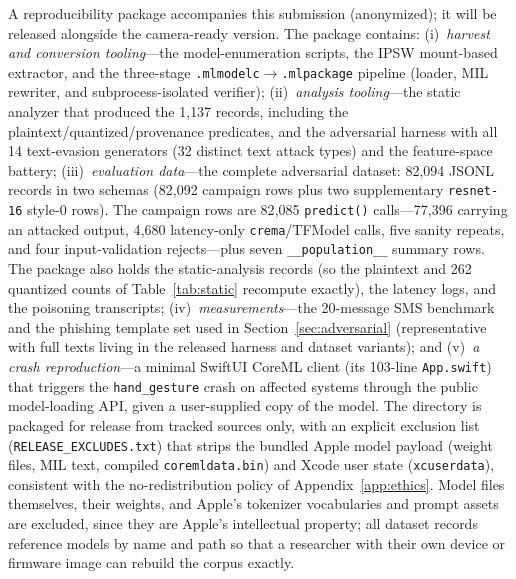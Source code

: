 \documentclass[letterpaper,twocolumn,10pt]{article}
\newcommand{\mlmodelc}{\texttt{.mlmodelc}\xspace}
\newcommand{\mlpackage}{\texttt{.mlpackage}\xspace}
\begin{document}
A reproducibility package accompanies this submission (anonymized); it
will be released alongside the camera-ready version.  The package contains:
(i)~\emph{harvest and conversion tooling}---the model-enumeration scripts,
the IPSW mount-based extractor, and the three-stage
\mlmodelc{}$\rightarrow$\mlpackage{} pipeline (loader, MIL rewriter, and
subprocess-isolated verifier);
(ii)~\emph{analysis tooling}---the static analyzer that produced the 1{,}137
records, including the plaintext/quantized/provenance predicates, and the
adversarial harness with all 14 text-evasion generators (32 distinct text
attack types) and the feature-space battery;
(iii)~\emph{evaluation data}---the complete adversarial dataset: 82{,}094
JSONL records in two schemas (82{,}092 campaign rows plus two supplementary
\texttt{resnet-16} style-0 rows). The campaign rows are 82{,}085
\texttt{predict()} calls---77{,}396 carrying an attacked output, 4{,}680
latency-only \texttt{crema}/TFModel calls, five sanity repeats, and four
input-validation rejects---plus seven \texttt{\_\_population\_\_} summary
rows. The package also holds the static-analysis records (so the
plaintext and 262 quantized counts of Table~\ref{tab:static} recompute
exactly), the latency logs, and the poisoning transcripts;
(iv)~\emph{measurements}---the 20-message SMS benchmark and the phishing
template set used in Section~\ref{sec:adversarial} (representative
with full texts living in the released harness and dataset variants); and
(v)~\emph{a crash reproduction}---a minimal SwiftUI CoreML client (its
103-line \texttt{App.swift}) that triggers the \texttt{hand\_gesture}
crash on affected systems through the public model-loading API, given a
user-supplied copy of the model. The directory is packaged for release
from tracked sources only, with an explicit exclusion list
(\texttt{RELEASE\_EXCLUDES.txt}) that strips the bundled Apple model
payload (weight files, MIL text, compiled \texttt{coremldata.bin}) and
Xcode user state (\texttt{xcuserdata}), consistent with the
no-redistribution policy of Appendix~\ref{app:ethics}.
Model files themselves, their weights, and Apple's tokenizer vocabularies
and prompt assets are excluded, since they are Apple's intellectual
property; all dataset records reference models by name and path so
that a researcher with their own device or firmware image can rebuild the
corpus exactly.
\end{document}
